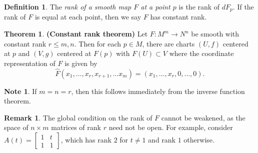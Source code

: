 \documentclass[10pt,letterpaper,cm]{nupset}
\theoremstyle{definition}
\newtheorem*{definition}{Definition}
\newtheorem{remark}{Remark}
\newtheorem{theorem}{Theorem}
\newtheorem*{note}{Note}
\newcommand{\1}{\mathbf{1}}
\newcommand{\0}{\vec 0}
\begin{document}
\begin{definition}
The \textit{rank of a smooth map $F$ at a point $p$} is the rank of $dF_p$. If the rank of $F$ is equal at each point, then we say $F$ has constant rank.
\end{definition}

\begin{theorem}{\textbf{(Constant rank theorem)}}
Let $F: M^m \to N^n$ be smooth with constant rank $r\leq m, n$. Then for each $p\in M$, there are charts $(U, f)$ centered at $p$ and $(V, g)$ centered at $F(p)$ with $F(U) \subset V$ where the coordinate representation of $F$ is given by $$\widehat{F}(x_1, \ldots, x_r, x_{r+1}, \ldots x_m) = (x_1, \ldots, x_r, 0,\ldots, 0).$$
\begin{note}
If $m=n =r$, then this follows immediately from the inverse function theorem. 
\end{note}

\begin{remark}
The global condition on the rank of $F$ cannot be weakened, as the space of $n\times m$ matrices of rank $r$ need not be open. For example, consider $A(t) = \begin{bmatrix} 1 & t \\ 1 & 1 \end{bmatrix}$, which has rank $2$ for $t\ne 1$ and rank $1$ otherwise.
\end{remark}
\end{theorem}
\end{document}

